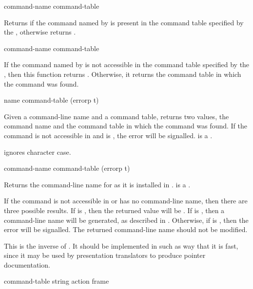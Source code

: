  {command-name command-table}

Returns  if the command named by  is present in
the command table specified by the 
, otherwise returns .

 {command-name command-table}

If the command named by  is not accessible in the command
table specified by the  , then
this function returns .  Otherwise, it returns the command table in
which the command was found.


 {name command-table \key (errorp t)}

Given a command-line name  and a command table, returns two values,
the command name and the command table in which the command was found.  If the
command is not accessible in  and  is
, the  error will be signalled.
 is a .

 ignores character case.

 {command-name command-table \key (errorp t)}

Returns the command-line name for  as it is installed in
.   is a .

If the command is not accessible in  or has no command-line
name, then there are three possible results.  If  is , then
the returned value will be .  If  is , then a
command-line name will be generated, as described in
.  Otherwise, if  is , then
the  error will be signalled.  The returned
command-line name should not be modified.

This is the inverse of .  It should be
implemented in such as way that it is fast, since it may be used by presentation
translators to produce pointer documentation.

 {command-table string action \key frame}

